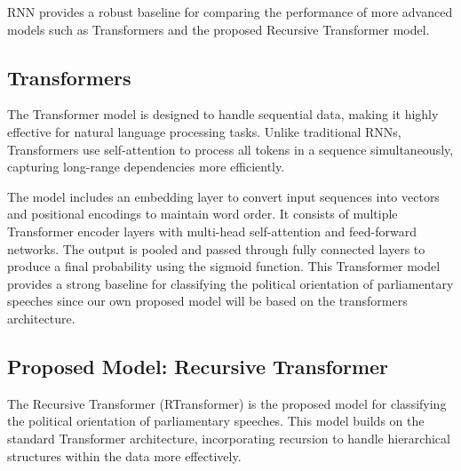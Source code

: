 \documentclass[10pt, a4paper]{article}
\begin{document}
RNN provides a robust baseline for comparing the performance of more advanced models such as Transformers and the proposed Recursive Transformer model.

\subsection{Transformers} 

The Transformer model is designed to handle sequential data, making it highly effective for natural language processing tasks. Unlike traditional RNNs, Transformers use self-attention to process all tokens in a sequence simultaneously, capturing long-range dependencies more efficiently.

The model includes an embedding layer to convert input sequences into vectors and positional encodings to maintain word order. It consists of multiple Transformer encoder layers with multi-head self-attention and feed-forward networks. The output is pooled and passed through fully connected layers to produce a final probability using the sigmoid function. This Transformer model provides a strong baseline for classifying the political orientation of parliamentary speeches since our own proposed model will be based on the transformers architecture.

\subsection{Proposed Model: Recursive Transformer} 

The Recursive Transformer (RTransformer) is the proposed model for classifying the political orientation of parliamentary speeches. This model builds on the standard Transformer architecture, incorporating recursion to handle hierarchical structures within the data more effectively. 
\end{document}
